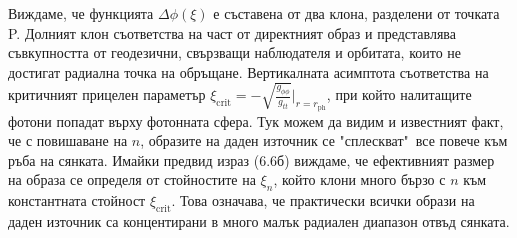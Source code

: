\begin{minipage}{20em}
	Виждаме, че функцията $\Delta\phi(\xi)$ е съставена от два клона, разделени от точката P. Долният клон съответства на част от директният образ и представлява съвкупността от геодезични, свързващи наблюдателя и орбитата, които не достигат радиална точка на обръщане. Вертикалната асимптота съответства на критичният прицелен параметър $\xi_\text{crit} = -\sqrt{\frac{g_{\phi\phi}}{g_{tt}}}\big\vert_{r = r_\text{ph}}$, при който налитащите фотони попадат върху фотонната сфера. Тук можем да видим и известният факт, че с повишаване на $n$, образите на даден източник се "сплескват"$\,$ все повече към ръба на сянката. Имайки предвид израз (6.6б) виждаме, че ефективният размер на образа се определя от стойностите на $\xi_n$, който клони много бързо с $n$ към константната стойност $\xi_\text{crit}$. Това означава, че практически всички образи на даден източник са концентирани в много малък радиален диапазон отвъд сянката.
\end{minipage}\\

